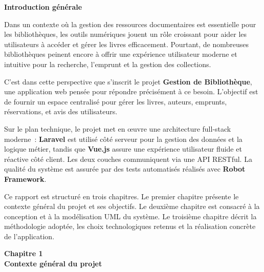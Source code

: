\documentclass{rapportPFA}
\begin{document}
\newpage
\listoffigures

\newpage
\thispagestyle{empty}
{}
\vspace*{3cm}
\begin{center}
    {\LARGE \textbf{Introduction générale}}
\end{center}
\vspace{2cm}

Dans un contexte où la gestion des ressources documentaires est essentielle pour les bibliothèques,
les outils numériques jouent un rôle croissant pour aider les utilisateurs à
accéder et gérer les livres efficacement. Pourtant, de nombreuses bibliothèques peinent encore à
offrir une expérience utilisateur moderne et intuitive pour la recherche, l'emprunt et la gestion
des collections.

C'est dans cette perspective que s'inscrit le projet \textbf{Gestion de Bibliothèque}, une application
web pensée pour répondre précisément à ce besoin. L'objectif est de fournir un espace
centralisé pour gérer les livres, auteurs, emprunts, réservations, et avis des utilisateurs.

Sur le plan technique, le projet met en \oe uvre une architecture full-stack moderne~:
\textbf{Laravel} est utilisé côté serveur pour la gestion des données et la
logique métier, tandis que \textbf{Vue.js} assure une expérience utilisateur fluide
et réactive côté client. Les deux couches communiquent via une API RESTful. La
qualité du système est assurée par des tests automatisés réalisés avec
\textbf{Robot Framework}.

Ce rapport est structuré en trois chapitres. Le premier chapitre présente le
contexte général du projet et ses objectifs. Le deuxième chapitre est consacré
à la conception et à la modélisation UML du système. Le troisième chapitre
décrit la méthodologie adoptée, les choix technologiques retenus et la réalisation
concrète de l'application.

\newpage
{}
{}
\vspace*{3cm}
\begin{center}
    {\Huge \textbf{Chapitre 1}}\\[0.5cm]
    {\LARGE \textbf{Contexte général du projet}}
\end{center}
\vspace{2cm}
\end{document}
